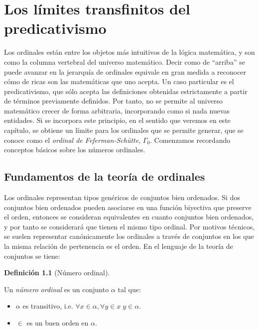 \documentclass[11pt,a4paper]{book}
\theoremstyle{plain}
\theoremstyle{definition}
\newtheorem{definicion}[teorema]{Definición}
\theoremstyle{remark}
\begin{document}

\chapter{Los límites transfinitos del predicativismo}
\label{capitulo-gamma-0}

Los ordinales están entre los objetos más intuitivos de la lógica matemática, y son como la columna vertebral del universo matemático. Decir como de ``arriba'' se puede avanzar en la jerarquía de ordinales equivale en gran medida a reconocer cómo de ricas son las matemáticas que uno acepta. Un caso particular es el predicativismo, que sólo acepta las definiciones obtenidas estrictamente a partir de términos previamente definidos. Por tanto, no se permite al universo matemático crecer de forma arbitraria, incorporando como si nada nuevas entidades. Si se incorpora este principio, en el sentido que veremos en este capítulo, se obtiene un límite para los ordinales que se permite generar, que se conoce como el \textit{ordinal de Feferman-Schütte}, $\Gamma_0$. Comenzamos recordando conceptos básicos sobre los números ordinales.

\section{Fundamentos de la teoría de ordinales}

Los ordinales representan tipos genéricos de conjuntos bien ordenados. Si dos conjuntos bien ordenados pueden asociarse en una función biyectiva que preserve el orden, entonces se consideran equivalentes en cuanto conjuntos bien ordenados, y por tanto se considerará que tienen el mismo tipo ordinal. Por motivos técnicos, se suelen representar canónicamente los ordinales a través de conjuntos en los que la misma relación de pertenencia es el orden. En el lenguaje de la teoría de conjuntos se tiene:

\begin{definicion}[Número ordinal]
\label{def-ordinales}

Un \textit{número ordinal} es un conjunto $\alpha$ tal que:

\begin{itemize}
  \item[i] $\alpha$ es transitivo, i.e. $\forall x \in \alpha, \forall y \in x \; y \in \alpha$.
  \item[ii]  $\in$ es un buen orden en $\alpha$.
\end{itemize}

\end{definicion}
\end{document}

